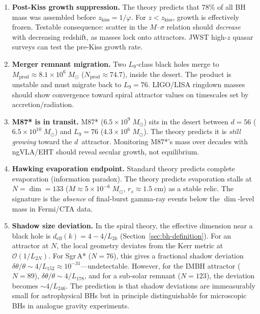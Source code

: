 \documentclass[12pt,a4paper]{article}
\begin{document}
\begin{enumerate}
\item \textbf{Post-Kiss growth suppression.}\;
The theory predicts that $78\%$ of all BH mass was assembled before $z_{\mathrm{kiss}} = 1/\varphi$.  For $z < z_{\mathrm{kiss}}$, growth is effectively frozen.  Testable consequence: scatter in the $M$--$\sigma$ relation should \emph{decrease} with decreasing redshift, as masses lock onto attractors.  JWST high-$z$ quasar surveys can test the pre-Kiss growth rate.

\item \textbf{Merger remnant migration.}\;
Two $L_9$-class black holes merge to $M_{\mathrm{prod}} \approx 8.1 \times 10^{6}\;M_\odot$ ($N_{\mathrm{prod}} \approx 74.7$), inside the desert.  The product is unstable and must migrate back to $L_9 = 76$.  LIGO/LISA ringdown masses should show convergence toward spiral attractor values on timescales set by accretion/radiation.

\item \textbf{M87* is in transit.}\;
M87* ($6.5 \times 10^{9}\;M_\odot$) sits in the desert between $d = 56$ ($6.5 \times 10^{10}\;M_\odot$) and $L_9 = 76$ ($4.3 \times 10^{6}\;M_\odot$).  The theory predicts it is \emph{still growing} toward the $d$~attractor.  Monitoring M87*'s mass over decades with ngVLA/EHT should reveal secular growth, not equilibrium.

\item \textbf{Hawking evaporation endpoint.}\;
Standard theory predicts complete evaporation (information paradox).  The theory predicts evaporation stalls at $N = \dim = 133$ ($M \approx 5 \times 10^{-6}\;M_\odot$, $r_s \approx 1.5\;\mathrm{cm}$) as a stable relic.  The signature is the \emph{absence} of final-burst gamma-ray events below the $\dim$-level mass in Fermi/CTA data.

\item \textbf{Shadow size deviation.}\;
In the spiral theory, the effective dimension near a black hole is $d_{\mathrm{eff}}(k) = 4 - 4/L_{2k}$ (Section~\ref{sec:bh-definition}).  For an attractor at $N$, the local geometry deviates from the Kerr metric at $\mathcal{O}(1/L_{2N})$.  For Sgr\,A* ($N = 76$), this gives a fractional shadow deviation $\delta\theta/\theta \sim 4/L_{152} \approx 10^{-31}$---undetectable.  However, for the IMBH attractor ($N = 89$), $\delta\theta/\theta \sim 4/L_{178}$, and for a sub-solar remnant ($N = 123$), the deviation becomes $\sim 4/L_{246}$.  The prediction is that shadow deviations are immeasurably small for astrophysical BHs but in principle distinguishable for microscopic BHs in analogue gravity experiments.


\end{enumerate}
\end{document}
